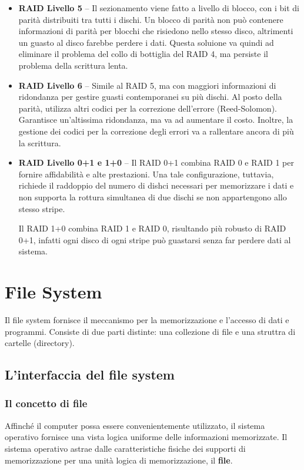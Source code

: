 \documentclass[a4paper]{article}
\begin{document}
\begin{itemize}
    \item \textbf{RAID Livello 5} -- Il sezionamento viene fatto a livello di blocco, con i bit di parità distribuiti tra tutti i dischi. Un blocco di parità non può contenere informazioni di parità per blocchi che risiedono nello stesso disco, altrimenti un guasto al disco farebbe perdere i dati. Questa soluione va quindi ad eliminare il problema del collo di bottiglia del RAID 4, ma persiste il problema della scrittura lenta.
    \item \textbf{RAID Livello 6} -- Simile al RAID 5, ma con maggiori informazioni di ridondanza per gestire guasti contemporanei su più dischi. Al posto della parità, utilizza altri codici per la correzione dell'errore (Reed-Solomon). Garantisce un'altissima ridondanza, ma va ad aumentare il costo. Inoltre, la gestione dei codici per la correzione degli errori va a rallentare ancora di più la scrittura.
    \item \textbf{RAID Livello 0+1 e 1+0} -- Il RAID 0+1 combina RAID 0 e RAID 1 per fornire affidabilità e alte prestazioni. Una tale configurazione, tuttavia, richiede il raddoppio del numero di dishci necessari per memorizzare i dati e non supporta la rottura simultanea di due dischi se non appartengono allo stesso stripe.

          Il RAID 1+0 combina RAID 1 e RAID 0, risultando più robusto di RAID 0+1, infatti ogni disco di ogni stripe può guastarsi senza far perdere dati al sistema.
\end{itemize}


\section{File System}
Il file system fornisce il meccanismo per la memorizzazione e l'accesso di dati e programmi. Consiste di due parti distinte: una collezione di file e una struttra di cartelle (directory).

\subsection{L'interfaccia del file system}

\subsubsection{Il concetto di file}
Affinché il computer possa essere convenientemente utilizzato, il sistema operativo fornisce una vista logica uniforme delle informazioni memorizzate. Il sistema operativo astrae dalle caratteristiche fisiche dei supporti di memorizzazione per una unità logica di memorizzazione, il \textbf{file}.
\end{document}
